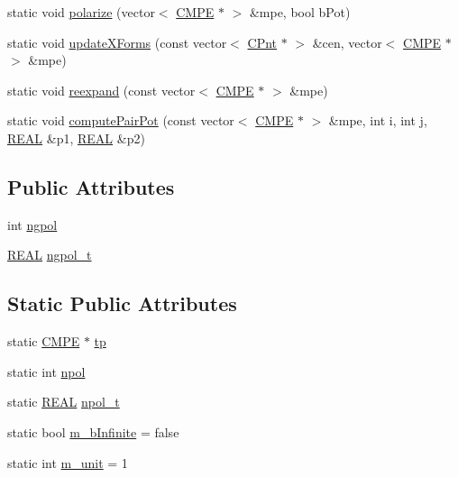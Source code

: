 \begin{DoxyCompactItemize}
\item 
static void \hyperlink{classCMPE_ab6f4e1fc5fe634c04841e691903d8029}{polarize} (vector$<$ \hyperlink{classCMPE}{C\-M\-P\-E} $\ast$ $>$ \&mpe, bool b\-Pot)
\item 
static void \hyperlink{classCMPE_a65d2f19a87b451dbd84bb4b11cbfd571}{update\-X\-Forms} (const vector$<$ \hyperlink{classCPnt}{C\-Pnt} $\ast$ $>$ \&cen, vector$<$ \hyperlink{classCMPE}{C\-M\-P\-E} $\ast$ $>$ \&mpe)
\item 
static void \hyperlink{classCMPE_af10ee159904becb5add924aa48df3c56}{reexpand} (const vector$<$ \hyperlink{classCMPE}{C\-M\-P\-E} $\ast$ $>$ \&mpe)
\item 
static void \hyperlink{classCMPE_ab494bf000a7dec9410d23a5f47204baf}{compute\-Pair\-Pot} (const vector$<$ \hyperlink{classCMPE}{C\-M\-P\-E} $\ast$ $>$ \&mpe, int i, int j, \hyperlink{util_8h_a5821460e95a0800cf9f24c38915cbbde}{R\-E\-A\-L} \&p1, \hyperlink{util_8h_a5821460e95a0800cf9f24c38915cbbde}{R\-E\-A\-L} \&p2)
\end{DoxyCompactItemize}
\subsection*{Public Attributes}
\begin{DoxyCompactItemize}
\item 
int \hyperlink{classCMPE_a17b9196644f13740f99675a5a0d8ef23}{ngpol}
\item 
\hyperlink{util_8h_a5821460e95a0800cf9f24c38915cbbde}{R\-E\-A\-L} \hyperlink{classCMPE_afc7b0e78e954f7bb1419864a70c4d0b7}{ngpol\-\_\-t}
\end{DoxyCompactItemize}
\subsection*{Static Public Attributes}
\begin{DoxyCompactItemize}
\item 
static \hyperlink{classCMPE}{C\-M\-P\-E} $\ast$ \hyperlink{classCMPE_a0e97f318480ca27d2a7d608379bd2d03}{tp}
\item 
static int \hyperlink{classCMPE_a5e34c1f47c24748db2704af61b370fc0}{npol}
\item 
static \hyperlink{util_8h_a5821460e95a0800cf9f24c38915cbbde}{R\-E\-A\-L} \hyperlink{classCMPE_a4e0a6b27c4cd14dd576fe94854c8d58d}{npol\-\_\-t}
\item 
static bool \hyperlink{classCMPE_a1c612f996b0be31759020f287d3ee7cc}{m\-\_\-b\-Infinite} = false
\item 
static int \hyperlink{classCMPE_adf1757fa41fec1996e7ca1c7fe6fc9e0}{m\-\_\-unit} = 1
\end{DoxyCompactItemize}


